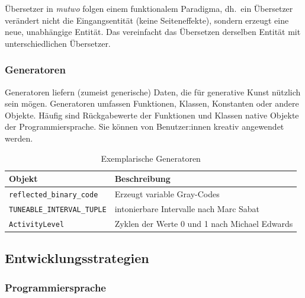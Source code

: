 \documentclass[12pt,a4paper,ngerman]{article}
\begin{document}
\smallskip


Übersetzer in \emph{mutwo} folgen einem funktionalem Paradigma, dh.\ ein Übersetzer verändert nicht die Eingangsentität (keine Seiteneffekte), sondern erzeugt eine neue, unabhängige Entität.
Das vereinfacht das Übersetzen derselben Entität mit unterschiedlichen Übersetzer.

\subsubsection{Generatoren}

Generatoren liefern (zumeist generische) Daten, die für generative Kunst nützlich sein mögen.
Generatoren umfassen Funktionen, Klassen, Konstanten oder andere Objekte.
Häufig sind Rückgabewerte der Funktionen und Klassen native Objekte der Programmiersprache.
Sie können von Benutzer:innen kreativ angewendet werden.

\begin{table}[h!]
    \begin{center}
        \begin{tabular}{l l} 
            \hline
            Objekt & Beschreibung \\ [0.5ex] 
            \hline\hline
            \texttt{reflected\_binary\_code} & Erzeugt variable Gray-Codes \\
            \texttt{TUNEABLE\_INTERVAL\_TUPLE} & intonierbare Intervalle nach Marc Sabat \\
            \texttt{ActivityLevel} & Zyklen der Werte 0 und 1 nach Michael Edwards \\ [1ex] 
            \hline
        \end{tabular}
    \end{center}

    \caption{Exemplarische Generatoren}
\end{table}


\subsection{Entwicklungsstrategien}

\subsubsection{Programmiersprache}
\label{programmingLanguage}
\end{document}

